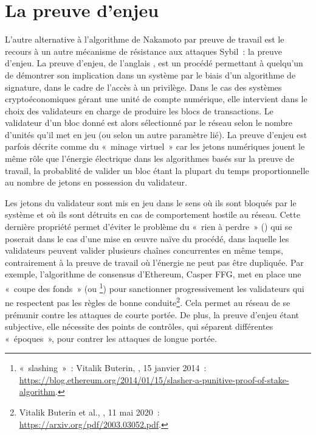 \vspace{-1em}
\section*{La preuve d'enjeu}

L'autre alternative à l'algorithme de Nakamoto par preuve de travail est le recours à un autre mécanisme de résistance aux attaques Sybil~: la preuve d'enjeu. La preuve d'enjeu, de l'anglais , est un procédé permettant à quelqu'un de démontrer son implication dans un système par le biais d'un algorithme de signature, dans le cadre de l'accès à un privilège. Dans le cas des systèmes cryptoéconomiques gérant une unité de compte numérique, elle intervient dans le choix des validateurs en charge de produire les blocs de transactions. Le validateur d'un bloc donné est alors sélectionné par le réseau selon le nombre d'unités qu'il met en jeu (ou selon un autre paramètre lié). La preuve d'enjeu est parfois décrite comme du «~minage virtuel~» car les jetons numériques jouent le même rôle que l'énergie électrique dans les algorithmes basés sur la preuve de travail, la probablité de valider un bloc étant la plupart du temps proportionnelle au nombre de jetons en possession du validateur.

Les jetons du validateur sont mis en jeu dans le sens où ils sont bloqués par le système et où ils sont détruits en cas de comportement hostile au réseau. Cette dernière propriété permet d'éviter le problème du «~rien à perdre~» () qui se poserait dans le cas d'une mise en œuvre naïve du procédé, dans laquelle les validateurs peuvent valider plusieurs chaînes concurrentes en même temps, contrairement à la preuve de travail où l'énergie ne peut pas être dupliquée. Par exemple, l'algorithme de consensus d'Ethereum, Casper FFG, met en place une «~coupe des fonds~» (ou \footnote{«~slashing~»~: Vitalik Buterin, , 15 janvier 2014~: \url{https://blog.ethereum.org/2014/01/15/slasher-a-punitive-proof-of-stake-algorithm}.}) pour sanctionner progressivement les validateurs qui ne respectent pas les règles de bonne conduite\footnote{Vitalik Buterin et al., , 11 mai 2020~: \url{https://arxiv.org/pdf/2003.03052.pdf}.}. Cela permet au réseau de se prémunir contre les attaques de courte portée. De plus, la preuve d'enjeu étant subjective, elle nécessite des points de contrôles, qui séparent différentes «~époques~», pour contrer les attaques de longue portée.

